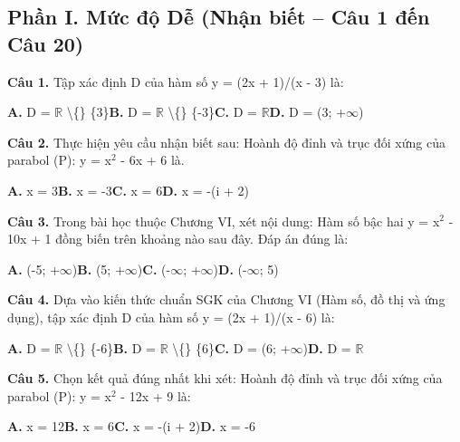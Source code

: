 \documentclass[11pt,a4paper]{article}
\begin{document}
\subsection*{\color{accent} Phần I. Mức độ Dễ (Nhận biết -- Câu 1 đến Câu 20)}
\textbf{\color{primary} Câu 1.} Tập xác định D của hàm số y = (2x + 1)/(x - 3) là:\par
\hspace*{1.5em}\textbf{A.} D = $\mathbb{R}$ \textbackslash\{\} \{3\}\quad\quad \textbf{B.} D = $\mathbb{R}$ \textbackslash\{\} \{-3\}\quad\quad \textbf{C.} D = $\mathbb{R}$\quad\quad \textbf{D.} D = (3; +$\infty$)\par\vspace{2pt}
\textbf{\color{primary} Câu 2.} Thực hiện yêu cầu nhận biết sau: Hoành độ đỉnh và trục đối xứng của parabol (P): y = x$^2$ - 6x + 6 là.\par
\hspace*{1.5em}\textbf{A.} x = 3\quad\quad \textbf{B.} x = -3\quad\quad \textbf{C.} x = 6\quad\quad \textbf{D.} x = -(i + 2)\par\vspace{2pt}
\textbf{\color{primary} Câu 3.} Trong bài học thuộc Chương VI, xét nội dung: Hàm số bậc hai y = x$^2$ - 10x + 1 đồng biến trên khoảng nào sau đây. Đáp án đúng là:\par
\hspace*{1.5em}\textbf{A.} (-5; +$\infty$)\quad\quad \textbf{B.} (5; +$\infty$)\quad\quad \textbf{C.} (-$\infty$; +$\infty$)\quad\quad \textbf{D.} (-$\infty$; 5)\par\vspace{2pt}
\textbf{\color{primary} Câu 4.} Dựa vào kiến thức chuẩn SGK của Chương VI (Hàm số, đồ thị và ứng dụng), tập xác định D của hàm số y = (2x + 1)/(x - 6) là:\par
\hspace*{1.5em}\textbf{A.} D = $\mathbb{R}$ \textbackslash\{\} \{-6\}\quad\quad \textbf{B.} D = $\mathbb{R}$ \textbackslash\{\} \{6\}\quad\quad \textbf{C.} D = (6; +$\infty$)\quad\quad \textbf{D.} D = $\mathbb{R}$\par\vspace{2pt}
\textbf{\color{primary} Câu 5.} Chọn kết quả đúng nhất khi xét: Hoành độ đỉnh và trục đối xứng của parabol (P): y = x$^2$ - 12x + 9 là:\par
\hspace*{1.5em}\textbf{A.} x = 12\quad\quad \textbf{B.} x = 6\quad\quad \textbf{C.} x = -(i + 2)\quad\quad \textbf{D.} x = -6\par\vspace{2pt}
\end{document}
